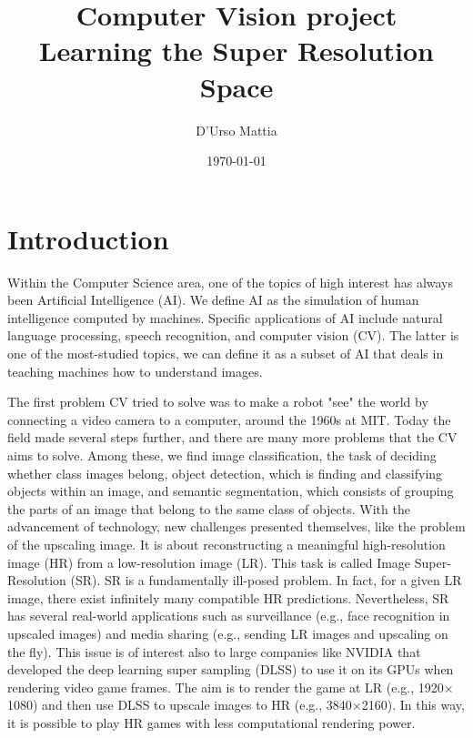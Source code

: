 \documentclass{article}
\author{D'Urso Mattia}
\date{\today}
\title{\small Computer Vision project \\ \LARGE Learning the Super Resolution Space}
\begin{document}
\maketitle
\clearpage
\tableofcontents
\clearpage

\section{Introduction}
Within the Computer Science area, one of the topics of high interest has always been Artificial Intelligence (AI). We define AI as the simulation of human intelligence computed by machines. Specific applications of AI include natural language processing, speech recognition, and computer vision (CV). The latter is one of the most-studied topics, we can define it as a subset of AI that deals in teaching machines how to understand images.

The first problem CV tried to solve was to make a robot "see" the world by connecting a video camera to a computer, around the 1960s at MIT. Today the field made several steps further, and there are many more problems that the CV aims to solve. Among these, we find image classification, the task of deciding whether class images belong, object detection, which is finding and classifying objects within an image, and semantic segmentation, which consists of grouping the parts of an image that belong to the same class of objects. With the advancement of technology, new challenges presented themselves, like the problem of the upscaling image. It is about reconstructing a meaningful high-resolution image (HR) from a low-resolution image (LR). This task is called Image Super-Resolution (SR). SR is a fundamentally ill-posed problem. In fact, for a given LR image, there exist infinitely many compatible HR predictions. Nevertheless, SR has several real-world applications such as surveillance (e.g., face recognition in upscaled images) and media sharing (e.g., sending LR images and upscaling on the fly). This issue is of interest also to large companies like NVIDIA that developed the deep learning super sampling (DLSS) \cite{dlss} to use it on its GPUs when rendering video game frames. The aim is to render the game at LR (e.g., 1920$\times$1080) and then use DLSS to upscale images to HR (e.g., 3840$\times$2160). In this way, it is possible to play HR games with less computational rendering power. 
\end{document}
